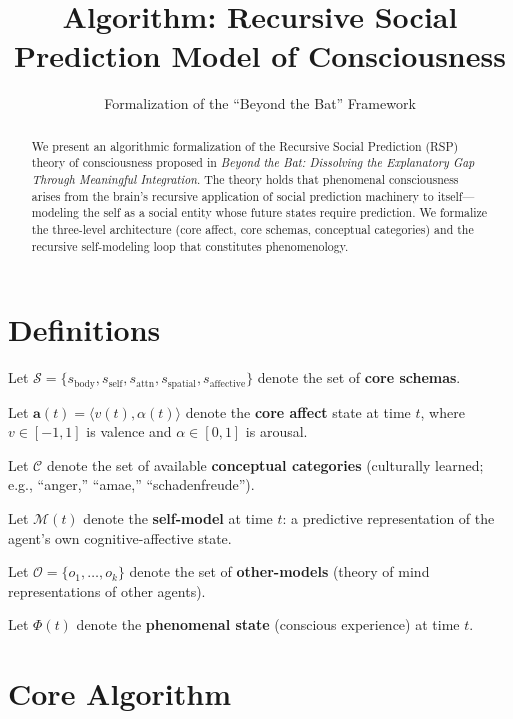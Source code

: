 \documentclass[11pt]{article}
\title{Algorithm: Recursive Social Prediction Model of Consciousness}
\author{Formalization of the ``Beyond the Bat'' Framework}
\date{}
\begin{document}
\maketitle

\begin{abstract}
We present an algorithmic formalization of the Recursive Social Prediction (RSP) theory of consciousness proposed in \emph{Beyond the Bat: Dissolving the Explanatory Gap Through Meaningful Integration}. The theory holds that phenomenal consciousness arises from the brain's recursive application of social prediction machinery to itself---modeling the self as a social entity whose future states require prediction. We formalize the three-level architecture (core affect, core schemas, conceptual categories) and the recursive self-modeling loop that constitutes phenomenology.
\end{abstract}

\section{Definitions}

Let $\mathcal{S} = \{s_\text{body}, s_\text{self}, s_\text{attn}, s_\text{spatial}, s_\text{affective}\}$ denote the set of \textbf{core schemas}.

Let $\mathbf{a}(t) = \langle v(t), \alpha(t) \rangle$ denote the \textbf{core affect} state at time $t$, where $v \in [-1, 1]$ is valence and $\alpha \in [0, 1]$ is arousal.

Let $\mathcal{C}$ denote the set of available \textbf{conceptual categories} (culturally learned; e.g., ``anger,'' ``amae,'' ``schadenfreude'').

Let $\mathcal{M}(t)$ denote the \textbf{self-model} at time $t$: a predictive representation of the agent's own cognitive-affective state.

Let $\mathcal{O} = \{o_1, \ldots, o_k\}$ denote the set of \textbf{other-models} (theory of mind representations of other agents).

Let $\Phi(t)$ denote the \textbf{phenomenal state} (conscious experience) at time $t$.

\section{Core Algorithm}
\end{document}
